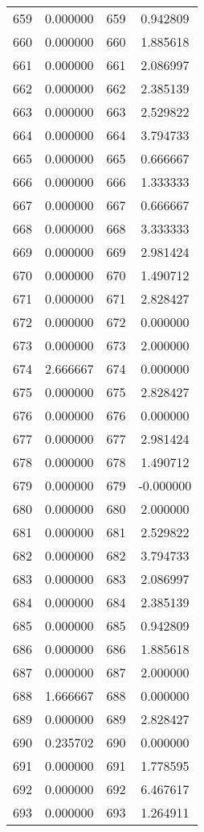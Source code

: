 \documentclass[12pt]{article}
\begin{document}
\begin{longtable}{@{}cccc@{}}
659 & 0.000000 & 659 & 0.942809 \\
660 & 0.000000 & 660 & 1.885618 \\
661 & 0.000000 & 661 & 2.086997 \\
662 & 0.000000 & 662 & 2.385139 \\
663 & 0.000000 & 663 & 2.529822 \\
664 & 0.000000 & 664 & 3.794733 \\
665 & 0.000000 & 665 & 0.666667 \\
666 & 0.000000 & 666 & 1.333333 \\
667 & 0.000000 & 667 & 0.666667 \\
668 & 0.000000 & 668 & 3.333333 \\
669 & 0.000000 & 669 & 2.981424 \\
670 & 0.000000 & 670 & 1.490712 \\
671 & 0.000000 & 671 & 2.828427 \\
672 & 0.000000 & 672 & 0.000000 \\
673 & 0.000000 & 673 & 2.000000 \\
674 & 2.666667 & 674 & 0.000000 \\
675 & 0.000000 & 675 & 2.828427 \\
676 & 0.000000 & 676 & 0.000000 \\
677 & 0.000000 & 677 & 2.981424 \\
678 & 0.000000 & 678 & 1.490712 \\
679 & 0.000000 & 679 & -0.000000 \\
680 & 0.000000 & 680 & 2.000000 \\
681 & 0.000000 & 681 & 2.529822 \\
682 & 0.000000 & 682 & 3.794733 \\
683 & 0.000000 & 683 & 2.086997 \\
684 & 0.000000 & 684 & 2.385139 \\
685 & 0.000000 & 685 & 0.942809 \\
686 & 0.000000 & 686 & 1.885618 \\
687 & 0.000000 & 687 & 2.000000 \\
688 & 1.666667 & 688 & 0.000000 \\
689 & 0.000000 & 689 & 2.828427 \\
690 & 0.235702 & 690 & 0.000000 \\
691 & 0.000000 & 691 & 1.778595 \\
692 & 0.000000 & 692 & 6.467617 \\
693 & 0.000000 & 693 & 1.264911 \\

\end{longtable}
\end{document}
